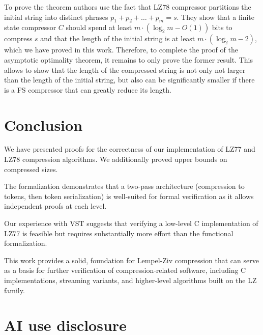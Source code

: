 \documentclass[
  a4paper, twocolumn, DIV=calc]{scrartcl}
\begin{document}
To prove the theorem authors use the fact that LZ78 compressor partitions the initial string into distinct phrases $p_1 + p_2 + \ldots + p_m = s$. They show that a finite state compressor $C$ should spend at least $m \cdot (\log_2 m - O(1))$ bits to compress $s$ and that the length of the initial string is at least $m \cdot (\log_2 m - 2)$, which we have proved in this work. Therefore, to complete the proof of the asymptotic optimality theorem, it remains to only prove the former result. This allows to show that the length of the compressed string is not only not larger than the length of the initial string, but also can be significantly smaller if there is a FS compressor that can greatly reduce its length.

\section{Conclusion}

We have presented proofs for the correctness of our implementation of LZ77 and
LZ78 compression algorithms. We additionally proved upper bounds on
compressed sizes.

The formalization demonstrates that a two-pass architecture (compression to
tokens, then token serialization) is well-suited for formal verification as it
allows independent proofs at each level.

Our experience with VST suggests that verifying a low-level C
implementation of LZ77 is feasible but requires substantially more
effort than the functional formalization.

This work provides a solid, foundation for Lempel-Ziv compression that
can serve as a basis for further verification of compression-related
software, including C implementations, streaming variants, and
higher-level algorithms built on the LZ family.

\section{AI use disclosure}
\end{document}
